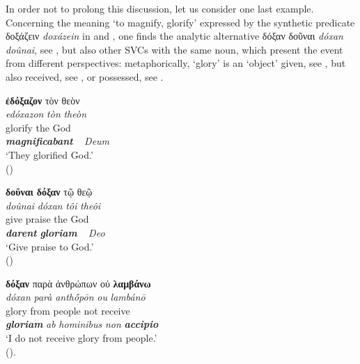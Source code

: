 \documentclass[output=paper,colorlinks,citecolor=brown]{langscibook}
\begin{document}
\z

\z

In order not to prolong this discussion, let us consider one last example. Concerning the
meaning `to magnify, glorify' expressed by the synthetic predicate δοξάζειν
\emph{doxázein} in  and , one finds the analytic
alternative δόξαν δοῦναι \emph{dóxan doûnai}, see , but also other SVCs with
the same noun, which present the event from different perspectives: metaphorically,
`glory' is an `object' given, see , but also received, see , or
possessed, see .

\ea\label{ex:bj:8}

\ea\label{ex:bj:8a}

\gllll \textbf{ἐδόξαζον} τὸν θεὸν\\
 \textit{edóxazon} \textit{tòn} \textit{theòn}\\
glorify the God\\
\textbf{\itshape magnificabant} ~ \emph{Deum}\\
\glt `They glorified God.' \\
\hspace*{\fill}()

\ex\label{ex:bj:8b}

\gllll \textbf{δοῦναι} \textbf{δόξαν} τῷ θεῷ\\
 \textit{doûnai} \textit{dóxan} \textit{tôi} \textit{theôi}\\
give praise the God\\
\emph{\bfseries darent} \emph{\bfseries gloriam} ~ \emph{Deo}\\
\glt `Give praise to God.' \\
\hspace*{\fill}()

\ex\label{ex:bj:8c}

\gllll \textbf{δόξαν} παρὰ ἀνθρώπων οὐ \textbf{λαμβάνω}\\
 \textit{dóxan} \textit{parà} \textit{anthṓpōn} \textit{ou} \textit{lambánō}\\
glory from people not receive\\
\textbf{\itshape gloriam} \emph{ab} \emph{hominibus} \emph{non} \textbf{\itshape accipio}\\
\glt `I do not receive glory from people.' \\
\hspace*{\fill}().

\ex\label{ex:bj:8d}
\end{document}
